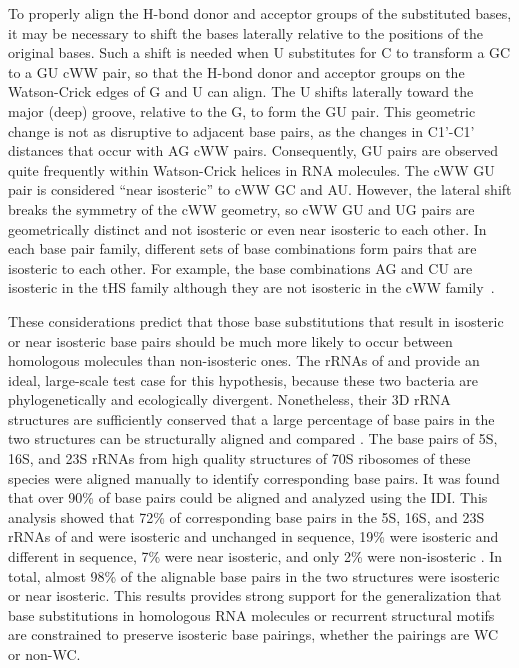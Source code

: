 To properly align the H-bond donor and acceptor groups of the substituted bases,
it may be necessary to shift the bases laterally relative to the positions of
the original bases. Such a shift is needed when U substitutes for C to transform
a GC to a GU cWW pair, so that the H-bond donor and acceptor groups on the
Watson-Crick edges of G and U can align. The U shifts laterally toward the major
(deep) groove, relative to the G, to form the GU pair. This geometric change is
not as disruptive to adjacent base pairs, as the changes in C1'-C1' distances
that occur with AG cWW pairs. Consequently, GU pairs are observed quite
frequently within Watson-Crick helices in RNA molecules. The cWW GU pair is
considered ``near isosteric'' to cWW GC and AU\@. However, the lateral shift breaks
the symmetry of the cWW geometry, so cWW GU and UG pairs are geometrically
distinct and not isosteric or even near isosteric to each other. In each base
pair family, different sets of base combinations form pairs that are isosteric
to each other. For example, the base combinations AG and CU are isosteric in the
tHS family although they are not isosteric in the cWW family~\cite{Leontis2002f, Leontis1998b}.

These considerations predict that those base substitutions that result in
isosteric or near isosteric base pairs should be much more likely to occur
between homologous molecules than non-isosteric ones. The rRNAs of \EC{} and
\TT{} provide an ideal, large-scale test case for this hypothesis, because these
two bacteria are phylogenetically and ecologically divergent. Nonetheless, their
3D rRNA structures are sufficiently conserved that a large percentage of base
pairs in the two structures can be structurally aligned and compared
\cite{Stombaugh2009}. The base pairs of 5S, 16S, and 23S rRNAs from high quality
structures of 70S ribosomes of these species were aligned manually to identify
corresponding base pairs. It was found that over 90\% of base pairs could be
aligned and analyzed using the IDI\@. This analysis showed that 72\% of
corresponding base pairs in the 5S, 16S, and 23S rRNAs of \EC{} and \TT{} were
isosteric and unchanged in sequence, 19\% were isosteric and different in
sequence, 7\% were near isosteric, and only 2\% were non-isosteric
\cite{Stombaugh2009}. In total, almost 98\% of the alignable base pairs in the
two structures were isosteric or near isosteric. This results provides strong
support for the generalization that base substitutions in homologous RNA
molecules or recurrent structural motifs are constrained to preserve isosteric
base pairings, whether the pairings are WC or non-WC.

